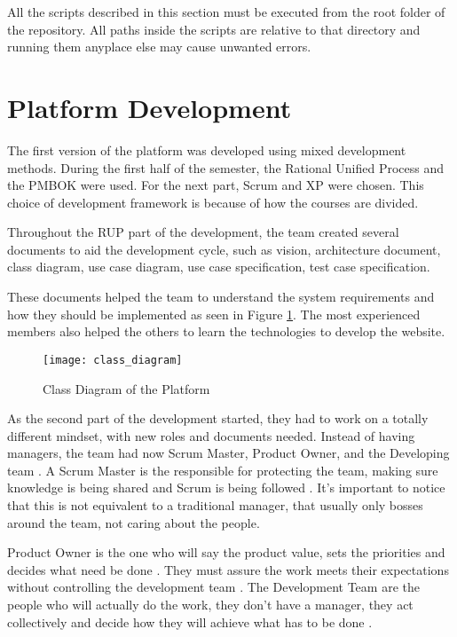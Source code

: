 All the scripts described in this section must be executed from the root folder of the repository. All paths inside the scripts are relative to that directory and running them anyplace else may cause unwanted errors.


\section{Platform Development}
\label{sec:platform_development}

The first version of the platform was developed using mixed development methods. During the first half of the semester, the Rational Unified Process and the PMBOK were used. For the next part, Scrum and XP were chosen. This choice of development framework is because of how the courses are divided.

Throughout the RUP part of the development, the team created several documents to aid the development cycle, such as vision, architecture document, class diagram, use case diagram, use case specification, test case specification.

These documents helped the team to understand the system requirements and how they should be implemented as seen in Figure \ref{fig:class_diagram}. The most experienced members also helped the others to learn the technologies to develop the website.


\begin{figure}[h!]
\centering
\texttt{[image: class\_diagram]}
\caption{Class Diagram of the Platform \cite{plataforma2017arquitetura}}
\label{fig:class_diagram}
\end{figure}

As the second part of the development started, they had to work on a totally different mindset, with new roles and documents needed. Instead of having managers, the team had now Scrum Master, Product Owner, and the Developing team \cite{agile422017}. A Scrum Master is the responsible for protecting the team, making sure knowledge is being shared and Scrum is being followed \cite{scrumalliance2017}. It's important to notice that this is not equivalent to a traditional manager, that usually only bosses around the team, not caring about the people.

Product Owner is the one who will say the product value, sets the priorities and decides what need be done \cite{agile422017}. They must assure the work meets their expectations without controlling the development team \cite{scrumalliance2017}. The Development Team are the people who will actually do the work, they don't have a manager, they act collectively and decide how they will achieve what has to be done \cite{scrumalliance2017}.

